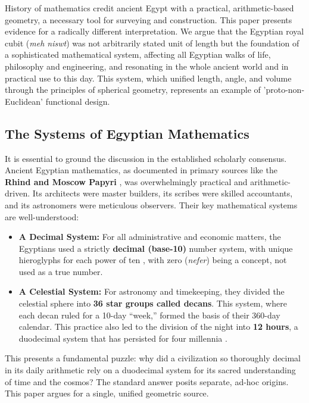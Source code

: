 \documentclass[11pt]{article}
\begin{document}
History of mathematics credit ancient Egypt with a practical, arithmetic-based geometry, a necessary tool for surveying and construction. This paper presents evidence for a radically different interpretation. We argue that the Egyptian royal cubit (\textit{meh niswt}) was not arbitrarily stated unit of length but the foundation of a sophisticated mathematical system, affecting all Egyptian walks of life, philosophy and engineering, and resonating in the whole ancient world and in practical use to this day. This system, which unified length, angle, and volume through the principles of spherical geometry, represents an example of 'proto-non-Euclidean' functional design.

\subsection{The Systems of Egyptian Mathematics}

It is essential to ground the discussion in the established scholarly consensus. Ancient Egyptian mathematics, as documented in primary sources like the \textbf{Rhind and Moscow Papyri} \cite{peet1923rhind, chace1927rhind, struve1930moscow}, was overwhelmingly practical and arithmetic-driven. Its architects were master builders, its scribes were skilled accountants, and its astronomers were meticulous observers. Their key mathematical systems are well-understood:
\begin{itemize}
    \item \textbf{A Decimal System:} For all administrative and economic matters, the Egyptians used a strictly \textbf{decimal (base-10)} number system, with unique hieroglyphs for each power of ten \cite{gardiner1957egyptian}, with zero (\textit{nefer}) being a concept, not used as a true number.
    \item \textbf{A Celestial System:} For astronomy and timekeeping, they divided the celestial sphere into \textbf{36 star groups called decans}. This system, where each decan ruled for a 10-day ``week,'' formed the basis of their 360-day calendar. This practice also led to the division of the night into \textbf{12 hours}, a duodecimal system that has persisted for four millennia \cite{neugebauer1969exact}.
\end{itemize}
This presents a fundamental puzzle: why did a civilization so thoroughly decimal in its daily arithmetic rely on a duodecimal system for its sacred understanding of time and the cosmos? The standard answer posits separate, ad-hoc origins. This paper argues for a single, unified geometric source.
\end{document}
